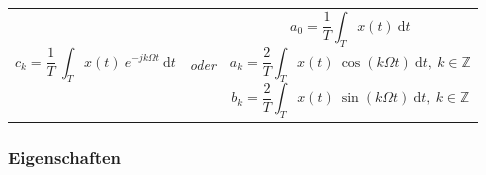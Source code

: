 \documentclass[10pt,a4paper]{article}
\begin{document}
\begin{centering}
\begin{tabular}{ >{\centering\arraybackslash} m{7cm} >{\centering\arraybackslash} m{1cm} >{\centering\arraybackslash} m{7cm} }

\[
	c_k = \frac{1}{T} ~ \int_T x(t) ~ e^{-jk\Omega t} ~ \mathrm dt
\] & \textit{\sffamily oder} & {
\[
	a_0 = \frac{1}{T} \int_T x(t) ~ \mathrm dt
\]
\[
	a_k = \frac{2}{T} \int_T x(t) ~ \cos(k\Omega t) ~ \mathrm dt, ~ k \in \mathbb Z
\]
\[
	b_k = \frac{2}{T} \int_T x(t) ~ \sin(k\Omega t) ~ \mathrm dt, ~ k \in \mathbb Z
\]
}\\
\end{tabular}
\end{centering}

\subsubsection*{Eigenschaften}
\end{document}
